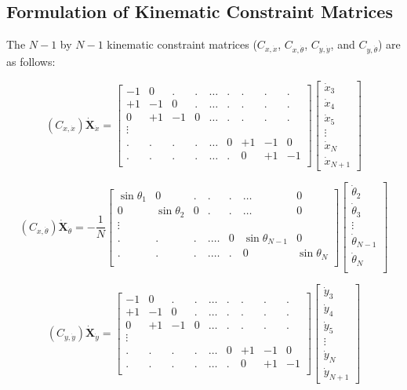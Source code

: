 \documentclass[12pt,letterpaper,titlepage]{article}
\begin{document}
\newpage

\subsection{Formulation of Kinematic Constraint Matrices}
The $N - 1$ by $N - 1$ kinematic constraint matrices ($C_{x,\dot{x}}$, $C_{x,\dot{\theta}}$, $C_{y,\dot{y}}$, and $C_{y,\dot{\theta}}$) are as follows:

\[
(C_{x,\dot{x}}) \mathbf{\dot{X}}_{\dot{x}} = \begin{bmatrix}
-1&0&.&.&\hdots&.&.&.&.\\
+1&-1&0&.&\hdots&.&.&.&.\\
0&+1&-1&0&\hdots&.&.&.&.\\
\vdots \\
.&.&.&.&\hdots&0&+1&-1&0\\
.&.&.&.&\hdots&.&0&+1&-1\\
\end{bmatrix}
\begin{bmatrix}
\dot{x}_3\\
\dot{x}_4\\
\dot{x}_5\\
\vdots\\
\dot{x}_N\\
\dot{x}_{N+1}
\end{bmatrix}
\]

\[
(C_{x,\dot{\theta}}) \mathbf{\dot{X}}_{\dot{\theta}} = - \frac{1}{N} \begin{bmatrix}
\sin\theta_1&0&.&.&.& \hdots &0\\
0&\sin\theta_2&0&.&.& \hdots &0\\
\vdots \\
.&.&.&.\hdots &0&\sin\theta_{N-1}&0\\
.&.&.&.\hdots &.&0&\sin\theta_N\\
\end{bmatrix}
\begin{bmatrix}
\dot{\theta}_2\\
\dot{\theta}_3\\
\vdots\\
\dot{\theta}_{N-1}\\
\dot{\theta}_N\\
\end{bmatrix}
\]

\[
(C_{y,\dot{y}}) \mathbf{\dot{X}}_{\dot{y}} = \begin{bmatrix}
-1&0&.&.&\hdots&.&.&.&.\\
+1&-1&0&.&\hdots&.&.&.&.\\
0&+1&-1&0&\hdots&.&.&.&.\\
\vdots \\
.&.&.&.&\hdots&0&+1&-1&0\\
.&.&.&.&\hdots&.&0&+1&-1\\
\end{bmatrix}
\begin{bmatrix}
\dot{y}_3\\
\dot{y}_4\\
\dot{y}_5\\
\vdots\\
\dot{y}_N\\
\dot{y}_{N+1}
\end{bmatrix}
\]
\end{document}
